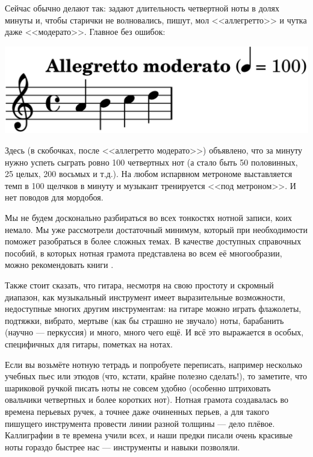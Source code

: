 Сейчас обычно делают так: задают длительность четвертной ноты в долях минуты и, чтобы старички не волновались, пишут, мол <<аллегретто>> и чутка даже <<модерато>>. Главное без ошибок:
\begin{center}
    \includegraphics{fig/notes/tempo}
\end{center}

Здесь (в скобочках, после <<аллегретто модерато>>) объявлено, что за минуту нужно успеть сыграть ровно 100 четвертных нот (а стало быть 50 половинных, 25 целых, 200 восьмых и т.д.). На любом испарвном метрономе выставляется темп в 100 щелчков в минуту и музыкант тренируется <<под метроном>>. И нет поводов для мордобоя. 

Мы не будем досконально разбираться во всех тонкостях нотной записи, коих немало. Мы уже рассмотрели достаточный минимум, который при необходимости поможет разобраться в более сложных темах. В качестве доступных справочных пособий, в которых нотная грамота представлена во всем её многообразии, можно рекомендовать книги \cite{bib:alekseev:MusicTheory,bib:vahromeev:Theory}.

Также стоит сказать, что гитара, несмотря на свою простоту и скромный диапазон, как музыкальный инструмент имеет выразительные возможности, недоступные многих другим инструментам: на гитаре можно играть флажолеты, подтяжки, вибрато, мертыве (как бы страшно не звучало) ноты, барабанить (научно --- перкуссия) и много, много чего ещё. И всё это выражается в особых, специфичных для гитары, пометках на нотах.

Если вы возьмёте нотную тетрадь и попробуете переписать, например несколько учебных пьес или этюдов (что, кстати, крайне полезно сделать!), то заметите, что шариковой ручкой писать ноты не совсем удобно (особенно штриховать овальчики четвертных и более коротких нот). Нотная грамота создавалась во времена перьевых ручек, а точнее даже очиненных перьев, а для такого пишущего инструмента провести линии разной толщины --- дело плёвое. Каллиграфии в те времена учили всех, и наши предки писали очень красивые ноты гораздо быстрее нас --- инструменты и навыки позволяли.

